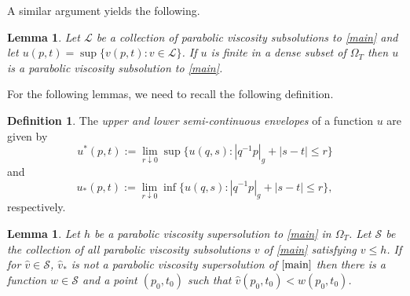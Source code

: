 \documentclass[12pt]{amsart}
\newtheorem{lemma}[thm]{Lemma}
\theoremstyle{definition}
\newtheorem{definition}{Definition}
\theoremstyle{remark}
\numberwithin{equation}{section}
\begin{document}
A similar argument yields the following.
\begin{lemma}\label{closedsup} 
Let $\mathcal{L}$ be a collection of parabolic viscosity subsolutions to \eqref{main} and let $u(p,t) = \sup\{v(p,t): v \in \mathcal{L}\}$.  If $u$ is finite in a dense subset of $\Omega_T$ then $u$ is a parabolic viscosity subsolution to \eqref{main}.  
\end{lemma}
For the following lemmas, we need to recall the following definition.
\begin{definition}
The \textit{upper and lower semi-continuous envelopes} of a function $u$ are given by 
$$u^*(p,t):= \lim_{r \downarrow 0}\sup \{u(q,s) : |q^{-1}p|_g + |s-t| \leq r\}$$
and
$$u_*(p,t):= \lim_{r \downarrow 0}\inf \{u(q,s) : |q^{-1}p|_g + |s-t| \leq r\},$$
respectively.
\end{definition}
\begin{lemma}\label{maximal}
Let $h$ be a parabolic viscosity supersolution to \eqref{main} in $\Omega_T$.  Let $\mathcal{S}$ be the collection of all parabolic viscosity subsolutions $v$ of \eqref{main} satisfying $v \leq h$.  If for $\hat{v} \in \mathcal{S}$, $\hat{v}_*$ is not a parabolic viscosity supersolution of $\eqref{main}$ then there is a function $w \in \mathcal{S}$ and a point $(p_0,t_0)$ such that $\hat{v}(p_0,t_0) < w(p_0,t_0)$.
\end{lemma}
\end{document}
